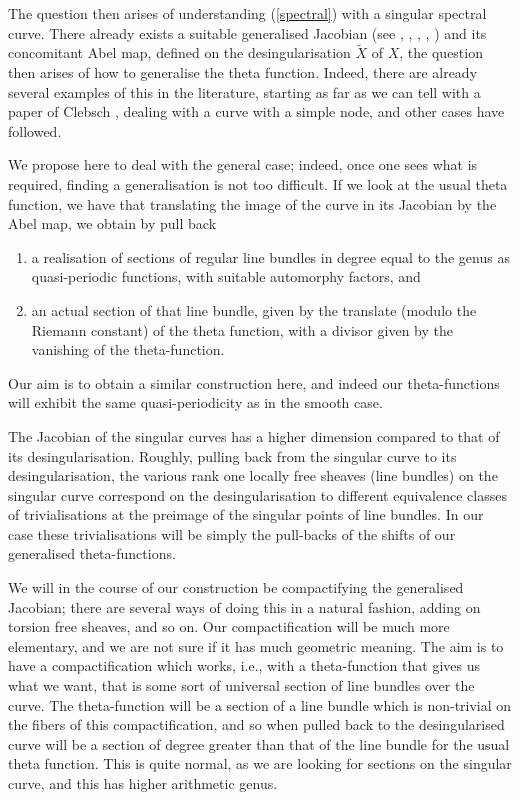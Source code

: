\documentclass[12pt,reqno]{amsart}
\numberwithin{equation}{section}
\theoremstyle{definition}
\theoremstyle{remark}
\begin{document}
The question then arises of understanding (\ref{spectral}) with a singular spectral curve. There already 
exists a suitable generalised Jacobian (see \cite{AK}, \cite{Ro}, \cite{Ca}, \cite{Gi}, \cite{OS})
and its concomitant Abel map, defined on the desingularisation $\widetilde X$ of $X$, the question then 
arises of how to generalise the theta function. Indeed, there are already several examples of this in the 
literature, starting as far as we can tell with a paper of Clebsch \cite{Cl}, dealing with a curve with a 
simple node, and other cases have followed.

We propose here to deal with the general case; indeed, once one sees what is required, finding a generalisation 
is not too difficult. If we look at the usual theta function, we have that translating the image of the curve in its Jacobian by the Abel map,
we obtain by pull back
\begin{enumerate}
\item a realisation of sections of  regular line bundles in degree equal to the genus as quasi-periodic
functions, with suitable automorphy factors, and

\item an actual section of that line bundle, given by the translate (modulo the Riemann constant)  of the theta function, with a divisor given by the
vanishing of the theta-function.
\end{enumerate}
Our aim is to obtain a similar construction here, and indeed our theta-functions will exhibit the same quasi-periodicity as in the smooth case.

The Jacobian of the singular curves has  a higher dimension  compared to that of its desingularisation. Roughly, pulling back from the singular curve to its desingularisation,  the various rank one locally free sheaves (line bundles) on the singular curve correspond on the desingularisation to different equivalence classes of trivialisations at the preimage of the singular points of line bundles. In our case these trivialisations will  be simply the pull-backs of the shifts of our generalised theta-functions.

We will in the course of our construction be compactifying the generalised Jacobian; 
there are several ways of doing this in a natural fashion, adding on torsion free sheaves, and so on.  Our 
compactification will be much more elementary, and we are not sure if it has much geometric meaning. The 
aim is to have a compactification which works, i.e., with a theta-function that gives us what we want, 
that is some sort of universal section of line bundles over the curve.  The theta-function will be a section of a line bundle which is non-trivial on the fibers of this compactification, and so when pulled back to the desingularised curve will be a section of degree greater than that of the line bundle for the
usual theta function. This is quite normal, as we are looking for sections on the singular curve, and this has higher arithmetic genus.
\end{document}
